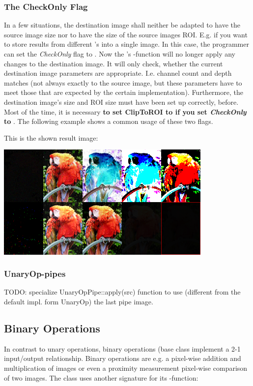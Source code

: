\subsubsection{The CheckOnly Flag\label{subsec:check-only}}
In a few situations, the destination image shall neither be adapted to have the source image size nor to have the size of the source images ROI. E.g. if you want to store results from different 's into a single image. In this case, the programmer can set the  \emph{CheckOnly} flag to . Now the 's -function will no longer apply any changes to the destination image. It will only check, whether the current destination image parameters are appropriate. I.e. channel count and depth matches (not always exactly to the source image, but these parameters have to meet those that are expected by the certain  implementation). Furthermore, the destination image's size and ROI size must have been set up correctly, before. Most of the time, it is necessary \textbf{to set ClipToROI to  if you set \emph{CheckOnly} to }. The following example shows a common usage of these two flags.


This is the shown result image:

\includegraphics[width=300pt]{media/check-only-example-output}

\subsubsection{UnaryOp-pipes}
TODO: specialize UnaryOpPipe::apply(src) function to use (different from the default impl. form UnaryOp) the last pipe image.

\subsection{Binary Operations\label{subsec:binary-ops}}
In contrast to unary operations, binary operations (base class  implement a 2-1 input/output relationship. Binary operations are e.g. a pixel-wise addition and multiplication of images or even a proximity measurement pixel-wise comparison of two images. The  class uses another signature for its -function:

